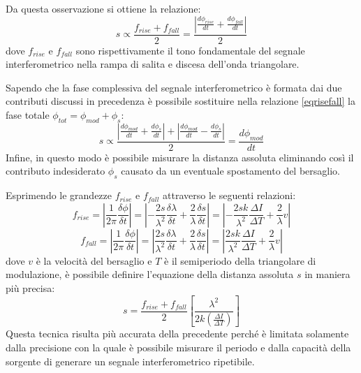 \begin{enumerate}
Da questa osservazione si ottiene la relazione:
\begin{equation}
	s \propto \frac{f_{rise}+f_{fall}}{2} = \frac{ \left | \frac{d\phi_{rise}}{dt} + \frac{d\phi_{fall}}{dt} \right |}{2}
	\label{eqrisefall}
\end{equation}
dove $f_{rise}$ e $f_{fall}$ sono rispettivamente il tono fondamentale del segnale interferometrico nella rampa di salita e discesa dell'onda triangolare.

Sapendo che la fase complessiva del segnale interferometrico è formata dai due contributi discussi in precedenza è possibile sostituire nella relazione \ref{eqrisefall} la fase totale $\phi_{tot} = \phi_{mod} + \phi_s$:
\begin{equation}
	s \propto \frac{ \left | \frac{d\phi_{mod}}{dt} + \frac{d\phi_{s}}{dt} \right |+ \left | \frac{d\phi_{mod}}{dt} - \frac{d\phi_{s}}{dt} \right |}{2} = \frac{d\phi_{mod}}{dt}
\end{equation}
Infine, in questo modo è possibile misurare la distanza assoluta eliminando così il contributo indesiderato $\phi_s$ causato da un eventuale spostamento del bersaglio.

Esprimendo le grandezze $f_{rise}$ e $f_{fall}$ attraverso le seguenti relazioni:
\begin{equation}
	f_{rise}= \left | \frac{1}{2\pi} \frac{\delta \phi}{\delta t} \right | = \left | - \frac{2s}{\lambda^2} \frac{\delta \lambda}{\delta t} + \frac{2}{\lambda} \frac{\delta s}{\delta t} \right | = \left | - \frac{2sk}{\lambda^2} \frac{\Delta I}{\Delta T} + \frac{2}{\lambda}v \right |
\end{equation}
\begin{equation}
	f_{fall}= \left | \frac{1}{2\pi} \frac{\delta \phi}{\delta t} \right | = \left | \frac{2s}{\lambda^2} \frac{\delta \lambda}{\delta t} + \frac{2}{\lambda} \frac{\delta s}{\delta t} \right | = \left | \frac{2sk}{\lambda^2} \frac{\Delta I}{\Delta T} + \frac{2}{\lambda}v \right |
\end{equation}
dove $v$ è la velocità del bersaglio e $T$ è il semiperiodo della triangolare di modulazione, è possibile definire l'equazione della distanza assoluta $s$ in maniera più precisa:
\begin{equation}
	s = \frac{f_{rise}+f_{fall}}{2} \left [ \frac{\lambda^2}{2k\left ( \frac{\Delta I}{\Delta T} \right )}  \right ]
\end{equation}
Questa tecnica risulta più accurata della precedente perché è limitata solamente dalla precisione con la quale è possibile misurare il periodo e dalla capacità della sorgente di generare un segnale interferometrico ripetibile. 

\end{enumerate}